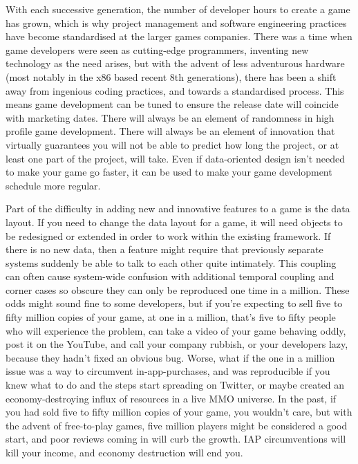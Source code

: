 \documentclass[a4paper,12pt]{book}
\begin{document}
With each successive generation, the number of developer hours to create a game has grown, which is why project management and software engineering practices have become standardised at the larger games companies.
There was a time when game developers were seen as cutting-edge programmers, inventing new technology as the need arises, but with the advent of less adventurous hardware (most notably in the x86 based recent 8th generations), there has been a shift away from ingenious coding practices, and towards a standardised process.
This means game development can be tuned to ensure the release date will coincide with marketing dates.
There will always be an element of randomness in high profile game development.
There will always be an element of innovation that virtually guarantees you will not be able to predict how long the project, or at least one part of the project, will take.
Even if data-oriented design isn't needed to make your game go faster, it can be used to make your game development schedule more regular.

Part of the difficulty in adding new and innovative features to a game is the data layout.
If you need to change the data layout for a game, it will need objects to be redesigned or extended in order to work within the existing framework.
If there is no new data, then a feature might require that previously separate systems suddenly be able to talk to each other quite intimately.
This coupling can often cause system-wide confusion with additional temporal coupling and corner cases so obscure they can only be reproduced one time in a million.
These odds might sound fine to some developers, but if you're expecting to sell five to fifty million copies of your game, at one in a million, that's five to fifty people who will experience the problem, can take a video of your game behaving oddly, post it on the YouTube, and call your company rubbish, or your developers lazy, because they hadn't fixed an obvious bug.
Worse, what if the one in a million issue was a way to circumvent in-app-purchases, and was reproducible if you knew what to do and the steps start spreading on Twitter, or maybe created an economy-destroying influx of resources in a live MMO universe.
In the past, if you had sold five to fifty million copies of your game, you wouldn't care, but with the advent of free-to-play games, five million players might be considered a good start, and poor reviews coming in will curb the growth.
IAP circumventions will kill your income, and economy destruction will end you.
\end{document}
